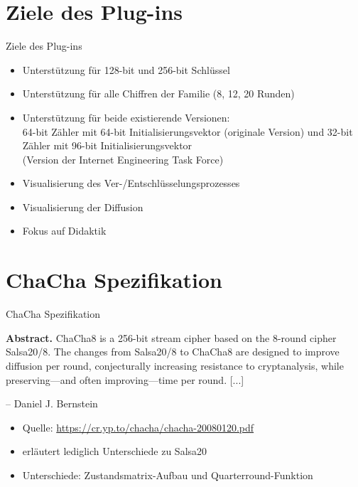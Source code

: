 \documentclass{beamer}
\begin{document}
\section{Ziele des Plug-ins}
\begin{frame}{Ziele des Plug-ins}
\begin{itemize}
\item Unterstützung für 128-bit und 256-bit Schlüssel
\item Unterstützung für alle Chiffren der Familie (8, 12, 20 Runden)
\item Unterstützung für beide existierende Versionen: \\64-bit Zähler mit 64-bit Initialisierungsvektor (originale Version) und 32-bit Zähler mit 96-bit Initialisierungsvektor \\(Version der Internet Engineering Task Force)
\item Visualisierung des Ver-/Entschlüsselungsprozesses
\item Visualisierung der Diffusion
\item Fokus auf Didaktik
\end{itemize}
\end{frame}

\section{ChaCha Spezifikation}
\begin{frame}{ChaCha Spezifikation}

\begin{center}
\parbox{0.8\textwidth}{
\textbf{Abstract.} ChaCha8 is a 256-bit stream cipher based on the 8-round
cipher Salsa20/8. The changes from Salsa20/8 to ChaCha8 are designed
to improve diffusion per round, conjecturally increasing resistance to
cryptanalysis, while preserving—and often improving—time per round. [...]
\vspace{-0.75em}
\begin{flushright}
-- Daniel J. Bernstein
\end{flushright}
}
\end{center}
\begin{itemize}
\item Quelle: \url{https://cr.yp.to/chacha/chacha-20080120.pdf}
\item erläutert lediglich Unterschiede zu Salsa20
\item Unterschiede: Zustandsmatrix-Aufbau und Quarterround-Funktion
\end{itemize}
\end{frame}
\end{document}
